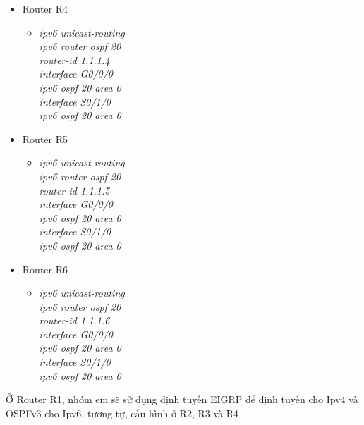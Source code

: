 \documentclass[12pt,a4paper]{report}
\begin{document}
\begin{itemize}
\begin{itemize}
\begin{itemize}
          \end{itemize}
             \item Router R4
           
        \begin{itemize}
         \item \textit{ipv6 unicast-routing\\
ipv6 router ospf 20\\
router-id 1.1.1.4\\
interface G0/0/0\\
ipv6 ospf 20 area 0\\
interface S0/1/0\\
ipv6 ospf 20 area 0\\}

		\end{itemize}
             \item Router R5
           
        \begin{itemize}
         \item \textit{ipv6 unicast-routing\\
ipv6 router ospf 20\\
router-id 1.1.1.5\\
interface G0/0/0\\
ipv6 ospf 20 area 0\\
interface S0/1/0\\
ipv6 ospf 20 area 0\\}

		\end{itemize}
             \item Router R6
           
        \begin{itemize}
         \item \textit{ipv6 unicast-routing\\
ipv6 router ospf 20\\
router-id 1.1.1.6\\
interface G0/0/0\\
ipv6 ospf 20 area 0\\
interface S0/1/0\\
ipv6 ospf 20 area 0\\}
        
          \end{itemize}
       \end{itemize}
       \hspace*{0.25cm} Ở Router R1, nhóm em sẽ sử dụng định tuyến EIGRP để định tuyến cho Ipv4 và OSPFv3 cho Ipv6, tương tự, cấu hình ở R2, R3 và R4\\
\end{itemize}
\end{document}
